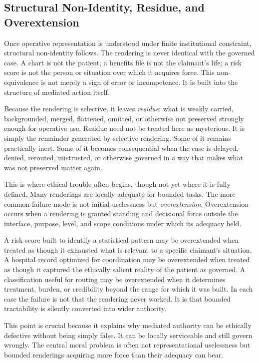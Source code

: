 \documentclass[11pt]{article}
\renewcommand{\emph}[1]{\textit{#1}}
\begin{document}
\subsection{Structural Non-Identity, Residue, and Overextension}

Once operative representation is understood under finite institutional constraint, structural non-identity follows. The rendering is never identical with the governed case. A chart is not the patient; a benefits file is not the claimant's life; a risk score is not the person or situation over which it acquires force. This non-equivalence is not merely a sign of error or incompetence. It is built into the structure of mediated action itself. \cite{Swanson2026ConstraintConditionDisclosure,Swanson2026ConstrainedDescribability,FriggNguyen2021ScientificRepresentationSEP}

Because the rendering is selective, it leaves \emph{residue}: what is weakly carried, backgrounded, merged, flattened, omitted, or otherwise not preserved strongly enough for operative use. Residue need not be treated here as mysterious. It is simply the remainder generated by selective rendering. Some of it remains practically inert. Some of it becomes consequential when the case is delayed, denied, rerouted, mistrusted, or otherwise governed in a way that makes what was not preserved matter again.

This is where ethical trouble often begins, though not yet where it is fully defined. Many renderings are locally adequate for bounded tasks. The more common failure mode is not initial uselessness but \emph{overextension}. Overextension occurs when a rendering is granted standing and decisional force outside the interface, purpose, level, and scope conditions under which its adequacy held.

A risk score built to identify a statistical pattern may be overextended when treated as though it exhausted what is relevant to a specific claimant's situation. A hospital record optimized for coordination may be overextended when treated as though it captured the ethically salient reality of the patient as governed. A classification useful for routing may be overextended when it determines treatment, burden, or credibility beyond the range for which it was built. In each case the failure is not that the rendering never worked. It is that bounded tractability is silently converted into wider authority.

This point is crucial because it explains why mediated authority can be ethically defective without being simply false. It can be locally serviceable and still govern wrongly. The central moral problem is often not representational uselessness but bounded renderings acquiring more force than their adequacy can bear.
\end{document}
